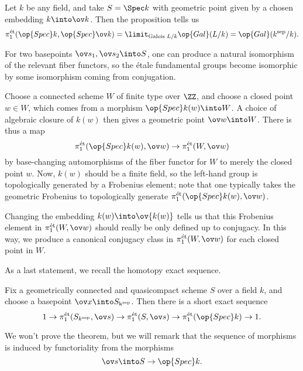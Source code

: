 \documentclass[../notes.tex]{subfiles}
\begin{document}
\begin{example}
	Let $k$ be any field, and take $S=\Spec k$ with geometric point given by a chosen embedding $k\into\ov k$. Then the proposition tells us
	\[\pi_1^{\mathrm{\acute et}}(\op{Spec}k,\op{Spec}\ov k)=\limit_{\text{Galois }L/k}\op{Gal}(L/k)=\op{Gal}(k^{\mathrm{sep}}/k).\]
\end{example}
\begin{remark}
	For two basepoints $\ov s_1,\ov s_2\into S$, one can produce a natural isomorphism of the relevant fiber functors, so the \'etale fundamental groups become isomorphic by some isomorphism coming from conjugation.
\end{remark}
\begin{remark}
	Choose a connected scheme $W$ of finite type over $\ZZ$, and choose a closed point $w\in W$, which comes from a morphism $\op{Spec}k(w)\into W$. A choice of algebraic closure of $k(w)$ then gives a geometric point $\ov w\into W$. There is thus a map
	\[\pi_1^{\mathrm{\acute et}}(\op{Spec}k(w),\ov w)\to\pi_1^{\mathrm{\acute et}}(W,\ov w)\]
	by base-changing automorphisms of the fiber functor for $W$ to merely the closed point $w$. Now, $k(w)$ should be a finite field, so the left-hand group is topologically generated by a Frobenius element; note that one typically takes the geometric Frobenius to topologically generate $\pi_1^{\mathrm{\acute et}}(\op{Spec}k(w),\ov w)$.
	
	Changing the embedding $k(w)\into\ov {k(w)}$ tells us that this Frobenius element in $\pi_1^{\mathrm{\acute et}}(W,\ov w)$ should really be only defined up to conjugacy. In this way, we produce a canonical conjugacy class in $\pi_1^{\mathrm{\acute et}}(W,\ov w)$ for each closed point in $W$.
\end{remark}
As a last statement, we recall the homotopy exact sequence.
\begin{theorem}
	Fix a geometrically connected and quasicompact scheme $S$ over a field $k$, and choose a basepoint $\ov x\into S_{\mathrm{k^{\mathrm{sep}}}}$. Then there is a short exact sequence
	\[1\to\pi_1^{\mathrm{\acute et}}(S_{k^{\mathrm{sep}}},\ov s)\to\pi_1^{\mathrm{\acute et}}(S,\ov s)\to\pi_1^{\mathrm{\acute et}}(\op{Spec}k)\to1.\]
\end{theorem}
\begin{remark}
	We won't prove the theorem, but we will remark that the sequence of morphisms is induced by functoriality from the morphisms
	\[\ov s\into S\to\op{Spec}k.\]
\end{remark}
\end{document}
